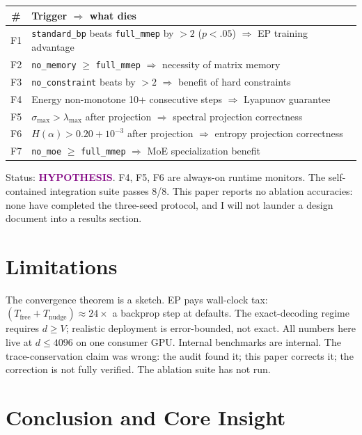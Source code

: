 \documentclass[11pt,letterpaper]{article}
\newcommand{\HYPOTHESIS}{\textbf{\textcolor{purple}{HYPOTHESIS}}}
\begin{document}
\begin{center}
\renewcommand{\arraystretch}{1.2}
\begin{tabular}{cl}
\toprule
\# & Trigger $\Rightarrow$ what dies \\
\midrule
F1 & \texttt{standard\_bp} beats \texttt{full\_mmep} by $>2$ ($p < .05$) $\Rightarrow$ EP training advantage \\
F2 & \texttt{no\_memory} $\geq$ \texttt{full\_mmep} $\Rightarrow$ necessity of matrix memory \\
F3 & \texttt{no\_constraint} beats by $> 2$ $\Rightarrow$ benefit of hard constraints \\
F4 & Energy non-monotone 10+ consecutive steps $\Rightarrow$ Lyapunov guarantee \\
F5 & $\sigma_{\max} > \lambda_{\max}$ after projection $\Rightarrow$ spectral projection correctness \\
F6 & $H(\alpha) > 0.20 + 10^{-3}$ after projection $\Rightarrow$ entropy projection correctness \\
F7 & \texttt{no\_moe} $\geq$ \texttt{full\_mmep} $\Rightarrow$ MoE specialization benefit \\
\bottomrule
\end{tabular}
\end{center}

Status: \HYPOTHESIS.  F4, F5, F6 are always-on runtime monitors.
The self-contained integration suite passes 8/8.
This paper reports no ablation accuracies: none have completed the three-seed
protocol, and I will not launder a design document into a results section.

\section{Limitations}

The convergence theorem is a sketch.  EP pays wall-clock tax:
$(T_{\text{free}} + T_{\text{nudge}}) \approx 24\times$ a backprop step at defaults.
The exact-decoding regime requires $d \geq V$; realistic deployment is
error-bounded, not exact.  All numbers here live at $d \leq 4096$ on one
consumer GPU.  Internal benchmarks are internal.  The trace-conservation claim
was wrong: the audit found it; this paper corrects it; the correction is not
fully verified.  The ablation suite has not run.

\section{Conclusion and Core Insight}
\label{sec:conclusion}
\end{document}
